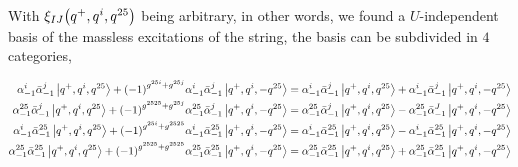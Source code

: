 With $\xi_{IJ}\qty(q^+,q^i,q^{25})$ being arbitrary, in other words, we found a $U$-independent basis of the massless excitations of the string, the basis can be 
subdivided in $4$ categories,

\begin{align*}
    \alpha^i_{-1}{\bar\alpha}^j_{-1}\ket{q^+,q^i,q^{25}}+\qty(-1)^{g^{25i}+g^{25j}}\alpha^i_{-1}{\bar\alpha}^j_{-1}\ket{q^+,q^i,-q^{25}}&=\alpha^i_{-1}{\bar\alpha}^j_{-1}\ket{q^+,q^i,q^{25}}+\alpha^i_{-1}{\bar\alpha}^j_{-1}\ket{q^+,q^i,-q^{25}}\\
    \alpha^{25}_{-1}{\bar\alpha}^j_{-1}\ket{q^+,q^i,q^{25}}+\qty(-1)^{g^{2525}+g^{25j}}\alpha^{25}_{-1}{\bar\alpha}^j_{-1}\ket{q^+,q^i,-q^{25}}&=\alpha^{25}_{-1}{\bar\alpha}^j_{-1}\ket{q^+,q^i,q^{25}}-\alpha^{25}_{-1}{\bar\alpha}^J_{-1}\ket{q^+,q^i,-q^{25}}\\
    \alpha^i_{-1}{\bar\alpha}^{25}_{-1}\ket{q^+,q^i,q^{25}}+\qty(-1)^{g^{25i}+g^{2525}}\alpha^i_{-1}{\bar\alpha}^{25}_{-1}\ket{q^+,q^i,-q^{25}}&=\alpha^i_{-1}{\bar\alpha}^{25}_{-1}\ket{q^+,q^i,q^{25}}-\alpha^i_{-1}{\bar\alpha}^{25}_{-1}\ket{q^+,q^i,-q^{25}}\\
    \alpha^{25}_{-1}{\bar\alpha}^{25}_{-1}\ket{q^+,q^i,q^{25}}+\qty(-1)^{g^{2525}+g^{2525}}\alpha^{25}_{-1}{\bar\alpha}^{25}_{-1}\ket{q^+,q^i,-q^{25}}&=\alpha^{25}_{-1}{\bar\alpha}^{25}_{-1}\ket{q^+,q^i,q^{25}}+\alpha^{25}_{-1}{\bar\alpha}^{25}_{-1}\ket{q^+,q^i,-q^{25}}
\end{align*}

\subsection{}



\subsection{}



\subsection{}